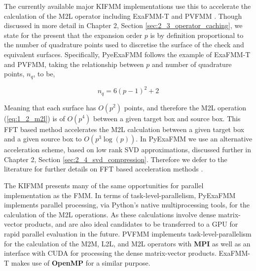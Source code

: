 The currently available major \gls{KIFMM} implementations use this to accelerate the calculation of the
M2L operator including ExaFMM-T and PVFMM \cite{Malhotra:2015:CCP, exafmm}. Though
discussed in more detail in Chapter 2, Section \ref{sec:2_3_operator_caching}, we state for
the present that the expansion order $p$ is by definition proportional to the
number of quadrature points used to discretise the surface of the check and
equivalent surfaces. Specifically, PyeExaFMM follows the example of ExaFMM-T and
PVFMM, taking the relationship between $p$ and number of quadrature points, $n_q$,
to be,

\begin{equation}
    n_q = 6(p-1)^2 + 2
\end{equation}

Meaning that each surface has $O(p^2)$ points, and therefore the M2L operation
(\ref{eq:1_2_m2l}) is of $O(p^4)$ between a given target box and source box.
This FFT based method accelerates the M2L calculation between a given target box
and a given source box to $O(p^3 \log(p))$. In PyExaFMM we use an alternative
acceleration scheme, based on low rank SVD approximations, discussed further in
Chapter 2, Section \ref{sec:2_4_svd_compression}. Therefore we defer to the
literature for further details on FFT based acceleration methods \cite{Malhotra:2015:CCP}.

The \gls{KIFMM} presents many of the same opportunities for parallel implementation
as the \gls{FMM}. In terms of \gls{task-level-parallelism}, PyExaFMM implements
parallel processing, via Python's native multiprocessing tools, for the calculation
of the M2L operations. As these calculations involve dense matrix-vector products, and are also ideal candidates to be transferred
to a \gls{GPU} for rapid parallel evaluation in the future. PVFMM implements
\gls{task-level-parallelism} for the calculation of the M2M, L2L, and M2L
operators with \textbf{\gls{MPI}} as well as an interface with \gls{CUDA} for
processing the dense matrix-vector products. ExaFMM-T makes use of
\textbf{\gls{OpenMP}} for a similar purpose.

